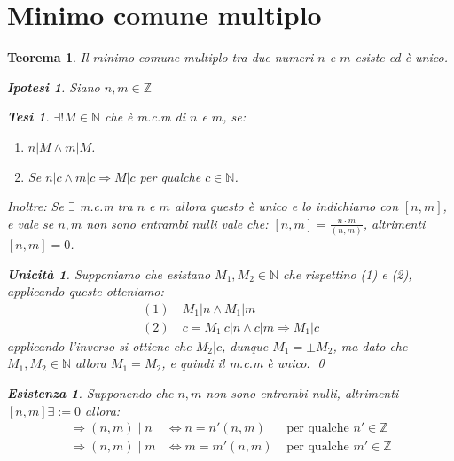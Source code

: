 \documentclass{article}
\makeatletter
\renewenvironment{proof}[1][\proofname]{\par
    \pushQED{\qed}%
    \normalfont \topsep6\p@\@plus6\p@\relax
    \trivlist
    \item\relax
    {\itshape
    #1\@addpunct{.}}\hspace\labelsep\ignorespaces
    }{%
    \popQED\endtrivlist\@endpefalse
}
\newtheorem{theorem}{Teorema}[part]
\newtheorem{ipothesis}[lemma]{Ipotesi}
\newtheorem{thesis}[lemma]{Tesi}
\theoremstyle{definition}
\newtheorem*{existence}{Esistenza}
\newtheorem*{uniqueness}{Unicità}
\makeatother
\begin{document}
\section[Minimo comune multiplo (MCM)]{Minimo comune multiplo}
\begin{theorem}
    Il minimo comune multiplo tra due numeri \(n\) e \(m\) esiste ed è unico.
    \begin{ipothesis}
        Siano \(n,m\in\mathbb{Z}\)
    \end{ipothesis}
    \begin{thesis}
        \(\exists!M\in\mathbb{N}\) che è m.c.m di \(n\) e \(m\), se:
        \begin{enumerate}
            \item \(n|M\land m|M\).
            \item Se \(n|c \land m|c \Rightarrow M|c\) per qualche \(c\in\mathbb{N}\). 
        \end{enumerate}
        Inoltre: Se \(\exists\) m.c.m tra \(n\) e \(m\) allora questo è unico e lo indichiamo con \([n,m]\), e vale se \(n,m\) non sono entrambi nulli vale che: \([n,m]=\frac{n\cdot m}{(n,m)}\), altrimenti \([n,m]=0\).
    \end{thesis}
    \begin{proof}
        \begin{uniqueness}
            Supponiamo che esistano \(M_1,M_2\in\mathbb{N}\) che rispettino (1) e (2), applicando queste otteniamo:
            \[
                \begin{aligned}
                    (1)&\ M_1|n \land M_1|m\\
                    (2)&\ c=M_1\ c|n \land c|m \Rightarrow M_1|c
                \end{aligned}
            \]
            applicando l'inverso si ottiene che \(M_2|c\), dunque \(M_1=\pm M_2\), ma dato che \(M_1,M_2\in\mathbb{N}\) allora \(M_1=M_2\), e quindi il m.c.m è unico.
            \qed
        \end{uniqueness}
        \begin{existence}
            Supponendo che \(n,m\) non sono entrambi nulli, altrimenti \([n,m]\exists :=0\) allora:
            \[
                \begin{aligned}
                    \Rightarrow (n,m)\mid n&\Leftrightarrow n=n'(n,m)&\text{ per qualche } n' \in\mathbb{Z}\\
                    \Rightarrow (n,m)\mid m&\Leftrightarrow m=m'(n,m)&\text{ per qualche } m' \in\mathbb{Z}
                \end{aligned}
\]
\end{existence}
\end{proof}
\end{theorem}
\end{document}
